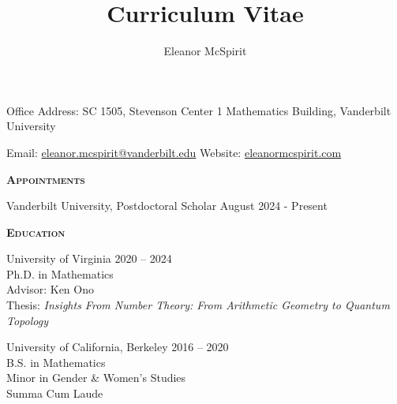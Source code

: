 \documentclass[11pt]{amsart}
\title{\large{Curriculum Vitae}}
\author{\large{Eleanor McSpirit}}
\theoremstyle{remark}
\begin{document}
\textbf{ }

\vspace{-.5in}

\maketitle 

\vspace{-.2in}

\large{Office Address: SC 1505, Stevenson Center 1 Mathematics Building, Vanderbilt University}

\large{Email: \href{eleanor.mcspirit@vanderbilt.edu}{eleanor.mcspirit@vanderbilt.edu} \hfill Website: \href{http://eleanormcspirit.com}{eleanormcspirit.com} 

\vspace{.1in}

\large{\textbf{\textsc{\textsc{Appointments}}}

Vanderbilt University, Postdoctoral Scholar \hfill August 2024 - Present

\vspace{.1in}

\large{\textbf{\textsc{\textsc{Education}}}

University of Virginia \hfill 2020 -- 2024 \\
Ph.D. in Mathematics\\ Advisor: Ken Ono \\
Thesis: \textit{Insights From Number Theory: From Arithmetic Geometry to Quantum Topology} \\

\vspace{-.1in}

University of California, Berkeley \hfill 2016 -- 2020 \\
B.S. in Mathematics\\ Minor in Gender \& Women's Studies \\
Summa Cum Laude


}}}
\end{document}

